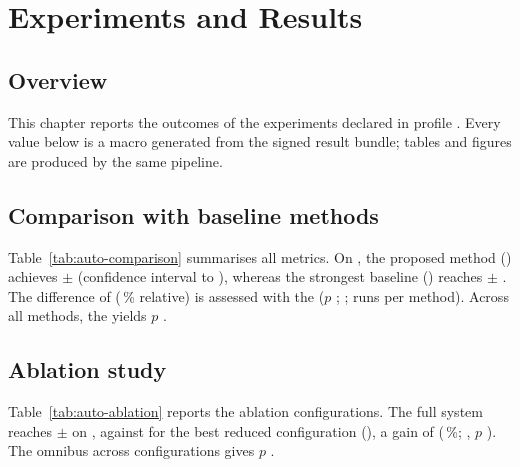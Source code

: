 \chapter{Experiments and Results}
\label{chap:experiments}

\section{Overview}
This chapter reports the outcomes of the experiments declared in profile \texttt{\ThesisProfileId}.
Every value below is a macro generated from the signed result bundle; tables and figures are
produced by the same pipeline.



\ifAutoHasComparison
\section{Comparison with baseline methods}
Table~\ref{tab:auto-comparison} summarises all metrics. On \MetricPrimaryName, the proposed
method (\MetricPrimaryProposedName) achieves \MetricPrimaryProposedMean{} $\pm$
\MetricPrimaryProposedStd{} \MetricPrimaryUnit{} (confidence interval \MetricPrimaryProposedCiLow{} to
\MetricPrimaryProposedCiHigh), whereas the strongest baseline (\MetricPrimaryRunnerUpName) reaches
\MetricPrimaryRunnerUpMean{} $\pm$ \MetricPrimaryRunnerUpStd. The difference of \DiffPrimaryAbs{}
(\DiffPrimaryRelPct\,\% relative) is assessed with the \StatPrimaryTest{} ($p$ \StatPrimaryPval;
\StatPrimaryEffectName{} \StatPrimaryEffect; \StatPrimaryN{} runs per method). Across all methods,
the \StatPrimaryOmnibusTest{} yields $p$ \StatPrimaryOmnibusPval.
\fi

\ifAutoHasAblation
\section{Ablation study}
Table~\ref{tab:auto-ablation} reports the ablation configurations. The full system reaches
\MetricPrimaryProposedMean{} $\pm$ \MetricPrimaryProposedStd{} \MetricPrimaryUnit{} on
\MetricPrimaryName, against \MetricPrimaryRunnerUpMean{} for the best reduced configuration
(\MetricPrimaryRunnerUpName), a gain of \DiffPrimaryAbs{} (\DiffPrimaryRelPct\,\%; \StatPrimaryTest,
$p$ \StatPrimaryPval). The omnibus \StatPrimaryOmnibusTest{} across configurations gives
$p$ \StatPrimaryOmnibusPval.
\fi

\ifAutoHasRsm
